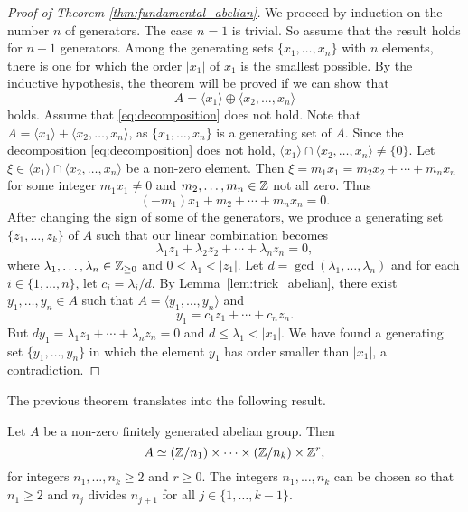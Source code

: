 \begin{proof}[Proof of Theorem \ref{thm:fundamental_abelian}]
    We proceed by induction on the number $n$ of generators. The case $n=1$ is trivial. So assume that the result holds for $n-1$ generators. 
    Among the generating sets $\{x_1,\dots,x_n\}$ 
    with $n$ elements, there is one 
    for which the order $|x_1|$ of $x_1$ is the smallest possible. By the inductive hypothesis, 
    the theorem will be proved if we can show that 
    \begin{equation}
    \label{eq:decomposition}
    A=\langle x_1\rangle\oplus \langle x_2,\dots,x_n\rangle
    \end{equation}
    holds. 
    Assume that \eqref{eq:decomposition} does not hold. 
    Note that 
    $A=\langle x_1\rangle+\langle x_2,\dots,x_n\rangle$, as 
    $\{x_1,\dots,x_n\}$ is a generating set of $A$. Since
    the decomposition  
    \eqref{eq:decomposition} does not hold, 
    $\langle x_1\rangle\cap \langle x_2,\dots,x_n\rangle\ne\{0\}$. Let  
    $\xi\in \langle x_1\rangle\cap \langle x_2,\dots,x_n\rangle$ be a non-zero element. Then 
    $\xi=m_1x_1=m_2x_2+\cdots+m_nx_n$ for some integer 
    $m_1x_1\ne 0$ and $m_2,\dots,m_n\in\mathbb{Z}$ not all zero.  Thus 
    \[ 
    (-m_1)x_1+m_2+\cdots+m_nx_n=0.
    \]
    After changing the sign of some of the generators, 
    we produce a generating set $\{z_1,\dots,z_k\}$ of $A$ 
    such that our linear combination becomes 
    \[ 
    \lambda_1z_1+\lambda_2z_2+\cdots+\lambda_nz_n=0, 
    \]
    where $\lambda_1,\dots,\lambda_n\in\mathbb{Z}_{\geq 0}$ 
    and $0<\lambda_1<|z_1|$. Let $d=\gcd(\lambda_1,\dots,\lambda_n)$ and
    for each $i\in\{1,\dots,n\}$, let 
    $c_i=\lambda_i/d$. 
    By Lemma~\ref{lem:trick_abelian}, there exist 
    $y_1,\dots,y_n\in A$ such that 
    $A=\langle y_1,\dots,y_n\rangle$ and 
    \[ 
    y_1=c_1z_1+\cdots+c_nz_n.
    \]
    But $dy_1=\lambda_1z_1+\cdots+\lambda_nz_n=0$ and 
    $d\leq \lambda_1<|x_1|$. We have found a generating set 
    $\{y_1,\dots,y_n\}$ in which the element
    $y_1$ has order smaller than $|x_1|$, a contradiction. 
\end{proof}

The previous theorem 
translates into the following result.

\begin{theorem}
\label{thm:abelian_factors}
    Let $A$ be a non-zero finitely generated 
    abelian group. Then 
    \[
    A\simeq (\mathbb{Z}/{n_1})\times\cdots\times (\mathbb{Z}/{n_k})\times\mathbb{Z}^r,
    \]
    for integers $n_1,\dots,n_k\geq2$ and 
    $r\geq0$. The integers
    $n_1,\dots,n_k$ 
    can be chosen so that $n_1\geq2$ and 
    $n_j$ divides $n_{j+1}$ for all $j\in\{1,\dots,k-1\}$. 
\end{theorem}

